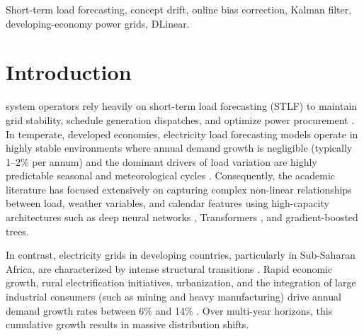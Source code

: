 \documentclass[journal]{IEEEtran}
\begin{document}
\begin{abstract}
Over the 6 cross-validation folds, TIDE improves the DLinear mean fold MAE from 93.9~MW to 75.9~MW (a 19.2\% relative error reduction, $p < 0.001$) and reduces systematic bias from -18.2~MW to -2.3~MW (an 87.3\% reduction). We demonstrate that TIDE generalizes seamlessly across eleven forecasting architectures---including LSTMs, Transformers, LightGBM, and classical statistical models---yielding a consistent 23--26\% improvement on ensemble predictions. Furthermore, TIDE outperforms traditional online correctors such as Simple Moving Averages, linear trend extrapolators, and Kalman filters while requiring no gradient calculations, no parameter updates, and only a single, non-sensitive hyperparameter ($\alpha = 0.3$). We contextualize these findings for developing-economy grids, analyzing the impacts of data volume, warm-starting retraining cycles, and Sobolev trajectory regularization, and present a lightweight production architecture suitable for resource-constrained utility environments.
\end{abstract}

\begin{IEEEkeywords}
Short-term load forecasting, concept drift, online bias correction, Kalman filter, developing-economy power grids, DLinear.
\end{IEEEkeywords}

\section{Introduction}
 system operators rely heavily on short-term load forecasting (STLF) to maintain grid stability, schedule generation dispatches, and optimize power procurement \cite{hippert2001}. In temperate, developed economies, electricity load forecasting models operate in highly stable environments where annual demand growth is negligible (typically 1--2\% per annum) and the dominant drivers of load variation are highly predictable seasonal and meteorological cycles \cite{lim2021, taylor2003}. Consequently, the academic literature has focused extensively on capturing complex non-linear relationships between load, weather variables, and calendar features using high-capacity architectures such as deep neural networks \cite{fallah2018}, Transformers \cite{zhou2021, wu2021}, and gradient-boosted trees.

In contrast, electricity grids in developing countries, particularly in Sub-Saharan Africa, are characterized by intense structural transitions \cite{iea2023}. Rapid economic growth, rural electrification initiatives, urbanization, and the integration of large industrial consumers (such as mining and heavy manufacturing) drive annual demand growth rates between 6\% and 14\% \cite{sobhani2020}. Over multi-year horizons, this cumulative growth results in massive distribution shifts.
\end{document}
